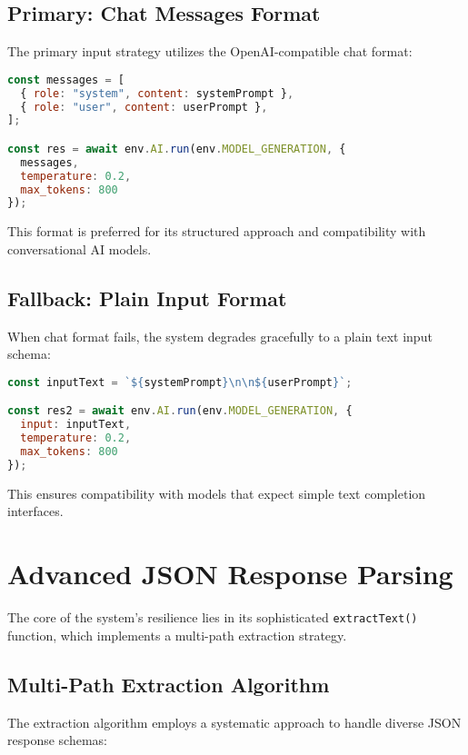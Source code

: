 \documentclass[11pt,a4paper]{article}
\begin{document}
\subsection{Primary: Chat Messages Format}

The primary input strategy utilizes the OpenAI-compatible chat format:

\begin{lstlisting}[language=JavaScript, caption=Chat Messages Format Implementation]
const messages = [
  { role: "system", content: systemPrompt },
  { role: "user", content: userPrompt },
];

const res = await env.AI.run(env.MODEL_GENERATION, { 
  messages, 
  temperature: 0.2, 
  max_tokens: 800 
});
\end{lstlisting}

This format is preferred for its structured approach and compatibility with conversational AI models.

\subsection{Fallback: Plain Input Format}

When chat format fails, the system degrades gracefully to a plain text input schema:

\begin{lstlisting}[language=JavaScript, caption=Plain Input Format Fallback]
const inputText = `${systemPrompt}\n\n${userPrompt}`;

const res2 = await env.AI.run(env.MODEL_GENERATION, { 
  input: inputText, 
  temperature: 0.2, 
  max_tokens: 800 
});
\end{lstlisting}

This ensures compatibility with models that expect simple text completion interfaces.

\section{Advanced JSON Response Parsing}

The core of the system's resilience lies in its sophisticated \texttt{extractText()} function, which implements a multi-path extraction strategy.

\subsection{Multi-Path Extraction Algorithm}

The extraction algorithm employs a systematic approach to handle diverse JSON response schemas:
\end{document}
